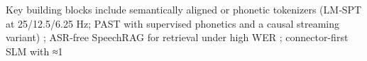 Key building blocks include semantically aligned or phonetic tokenizers (LM‑SPT at 25/12.5/6.25 Hz; PAST with supervised phonetics and a causal streaming variant) \cite{jo2025lmsptalignedsemanticdistillationspeechto,har-tuv2025pastphoneticacousticspeechtokenizer}; ASR‑free SpeechRAG for retrieval under high WER \cite{min2025speechretrievalaugmentedgenerationwithou}; connector-first SLM with ≈1%

